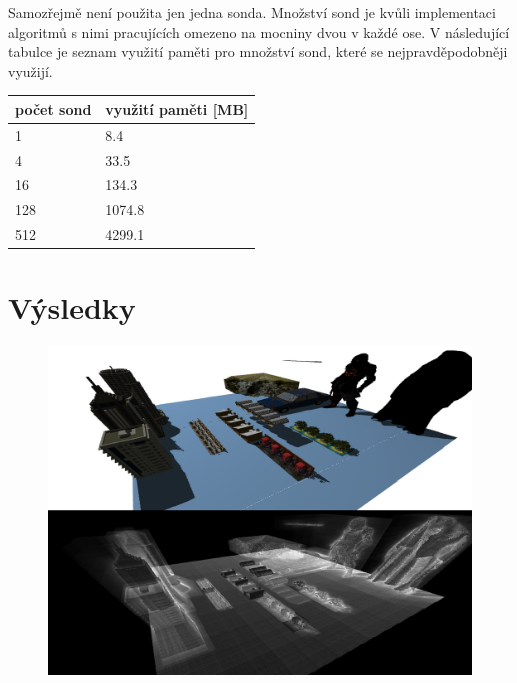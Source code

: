 Samozřejmě není použita jen jedna sonda. Množství sond je kvůli implementaci algoritmů s nimi pracujících omezeno na mocniny dvou v každé ose. V následující tabulce je seznam využití paměti pro množství sond, které se nejpravděpodobněji využijí.

\begin{table}[H]
	\centering
    \begin{tabular}{|l|l|}
    \hline
    počet sond & využití paměti {[}MB{]} \\ \hline
    1          & 8.4                     \\ \hline
    4          & 33.5                    \\ \hline
    16         & 134.3                   \\ \hline
    128        & 1074.8                  \\ \hline
    512        & 4299.1                  \\ \hline
    \end{tabular}
	\captionsetup{justification=centering}
\end{table}


\section{Výsledky}

\begin{figure}[H]
	\centering
	\captionsetup{justification=centering}
	\includegraphics[scale=0.2]{images/12M_scene.png}
	\label{fig:12M_render}
\end{figure}


